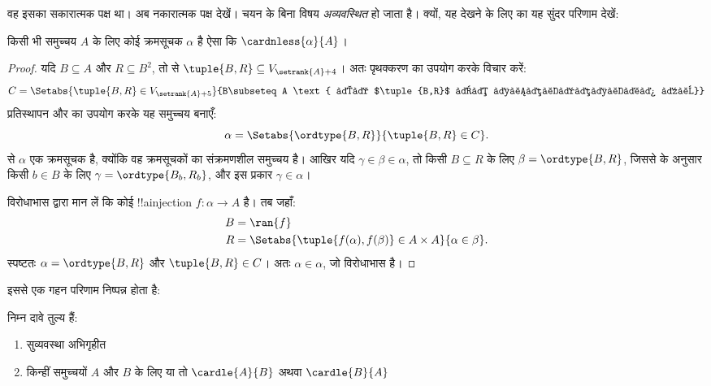 \documentclass[../../../include/open-logic-section]{subfiles}
\begin{document}

वह इसका सकारात्मक पक्ष था। अब नकारात्मक पक्ष देखें। चयन के बिना विषय
\emph{अव्यवस्थित} हो जाता है। क्यों, यह देखने के लिए
\cite{Hartogs1915} का यह सुंदर परिणाम देखें:

\begin{lem}[\emph{$\ZF$ में}]
किसी भी समुच्चय $A$ के लिए कोई क्रमसूचक $\alpha$ है ऐसा कि
$\cardnless{\alpha}{A}$।
\end{lem}

\begin{proof}
यदि $B\subseteq A$ और $R\subseteq B^2$, तो
 से
$\tuple{B,R}\subseteq V_{\setrank{A}+4}$। अतः पृथक्करण का उपयोग करके
विचार करें:
\[
	C = \Setabs{\tuple{B, R} \in V_{\setrank{A}+5}}{B\subseteq A 
	\text{ और $\tuple{B,R}$ एक सुव्यवस्था है}}
\]
प्रतिस्थापन और  का
उपयोग करके यह समुच्चय बनाएँ:
\[
	\alpha = \Setabs{\ordtype{B, R}}{\tuple{B, R} \in C}.
\]
 से $\alpha$ एक क्रमसूचक है,
क्योंकि वह क्रमसूचकों का संक्रमणशील समुच्चय है। आखिर यदि
$\gamma\in\beta\in\alpha$, तो किसी $B\subseteq R$ के लिए
$\beta=\ordtype{B,R}$, जिससे
 के अनुसार किसी $b\in B$ के
लिए $\gamma=\ordtype{B_b,R_b}$, और इस प्रकार $\gamma\in\alpha$।

विरोधाभास द्वारा मान लें कि कोई !!a{injection}
$f\colon\alpha\to A$ है। तब जहाँ:
\begin{align*}
	B &= \ran{f}\\
	R &= \Setabs{\tuple{f(\alpha), f(\beta)} \in A \times A}{\alpha \in \beta}.
\end{align*}
स्पष्टतः $\alpha=\ordtype{B,R}$ और $\tuple{B,R}\in C$। अतः
$\alpha\in\alpha$, जो विरोधाभास है।
\end{proof}

इससे एक गहन परिणाम निष्पन्न होता है:

\begin{thm}[\emph{$\ZF$ में}]
निम्न दावे तुल्य हैं:
\begin{enumerate}
	\item{} सुव्यवस्था अभिगृहीत
	\item{} किन्हीं समुच्चयों $A$ और $B$ के लिए या तो
	$\cardle{A}{B}$ अथवा $\cardle{B}{A}$
\end{enumerate}
\end{thm}
\end{document}
